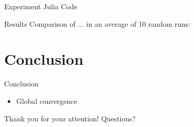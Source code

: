 \documentclass{beamer}
\begin{document}
\begin{frame}{Experiment}
    Julia Code
\end{frame}

\begin{frame}{Results}
    Comparison of ... in an average of 10 random runs:
    \begin{table}[H]
    \end{table}
\end{frame}

\section{Conclusion}

\begin{frame}{Conclusion}
    \begin{itemize}
        \item Global convergence
    \end{itemize}
    \begin{center}
        Thank you for your attention! Questions? 
    \end{center}
\end{frame}
\end{document}
